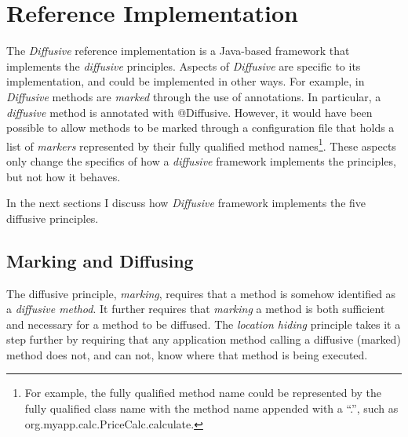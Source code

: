 \documentclass[11pt]{scrartcl}
\begin{document}
%
%
\section{Reference Implementation\label{sec:reference_implementation}}
The \emph{Diffusive} reference implementation is a Java-based framework that implements the \emph{diffusive} principles. Aspects of \emph{Diffusive} are specific to its implementation, and could be implemented in other ways. For example, in \emph{Diffusive} methods are \emph{marked} through the use of annotations. In particular, a \emph{diffusive} method is annotated with \textsf{@Diffusive}. However, it would have been possible to allow methods to be marked through a configuration file that holds a list of \emph{markers} represented by their fully qualified method names\footnote{For example, the fully qualified method name could be represented by the fully qualified class name with the method name appended with a ``.'', such as \textsf{org.myapp.calc.PriceCalc.calculate}.}. These aspects only change the specifics of how a \emph{diffusive} framework implements the principles, but not how it behaves.

In the next sections I discuss how \emph{Diffusive} framework implements the five diffusive principles.

\subsection{Marking and Diffusing\label{sec:marking_and_diffusing}}
The diffusive principle, \emph{marking}, requires that a method is somehow identified as a \emph{diffusive method}. It further requires that \emph{marking} a method is both sufficient and necessary for a method to be diffused. The \emph{location hiding} principle takes it a step further by requiring that any application method calling a diffusive (marked) method does not, and can not, know where that method is being executed.

\end{document}
